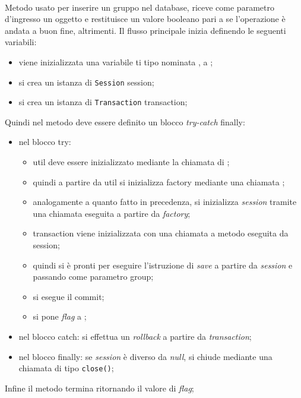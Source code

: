 \begin{description}
	\item{}\\
	Metodo usato per inserire un gruppo nel database, riceve come parametro d'ingresso un oggetto  e restituisce un valore booleano  pari a  se l'operazione è andata a buon fine,  altrimenti. Il flusso principale inizia definendo le seguenti variabili:
	\begin{itemize}
		\item viene inizializzata una variabile ti tipo  nominata , a ;
		\item si crea un istanza di \texttt{Session} session;
		\item si crea un istanza di \texttt{Transaction} transaction;
	\end{itemize}
	Quindi nel metodo deve essere definito un blocco \textit{try-catch} finally:
	\begin{itemize}
		\item nel blocco try:
		\begin{itemize}
			\item util deve essere inizializzato mediante la chiamata  di ;
			\item quindi a partire da util si inizializza factory mediante una chiamata ;
			\item analogamente a quanto fatto in precedenza, si inizializza \textit{session} tramite una chiamata  eseguita a partire da \textit{factory};
			\item transaction viene inizializzata con una chiamata a metodo  eseguita da session;
			\item quindi si è pronti per eseguire l'istruzione di \textit{save} a partire da \textit{session} e passando come parametro group;
			\item si esegue il commit;
			\item si pone \textit{flag} a ;
		\end{itemize}
		\item nel blocco catch: si effettua un \textit{rollback} a partire da \textit{transaction};
		\item nel blocco finally: se \textit{session} è diverso da \textit{null}, si chiude mediante una chiamata di tipo \texttt{close()};
	\end{itemize}
	Infine il metodo termina ritornando il valore di \textit{flag};
	

\end{description}
